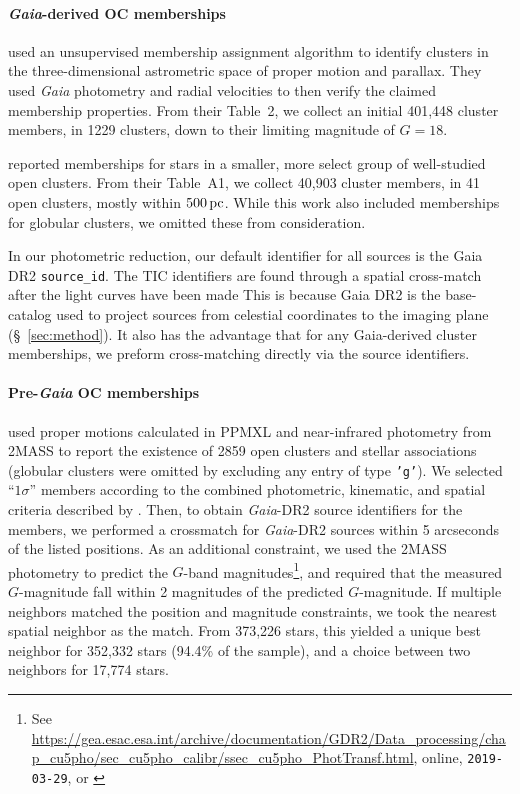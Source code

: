 \documentclass[12pt,twocolumn,tighten]{aastex62}
\begin{document}
\paragraph{{\it Gaia}-derived OC memberships}

\citet{cantat-gaudin_gaia_2018} used an unsupervised membership
assignment algorithm to identify clusters in the three-dimensional
astrometric space of proper motion and parallax. They used {\it Gaia}
photometry and radial velocities to then verify the claimed
membership properties.  From their Table~2, we collect an initial 401{,}448
cluster members, in 1229 clusters, down to their limiting magnitude of
$G=18$.

\citet{gaia_hr_2018} reported memberships for stars in a smaller, more
select group of well-studied open clusters. From their Table~A1, we
collect 40{,}903 cluster members, in 41 open clusters, mostly within
$500\,{\rm pc}$. While this work also included memberships for
globular clusters, we omitted these from consideration.

In our photometric reduction,  our default identifier for all sources
is the Gaia DR2 \texttt{source\_id}.
The TIC identifiers are found through a spatial cross-match after the light 
curves have been made
\citep{stassun_TIC_2018,stassun_TIC8_2019}
This is because Gaia DR2 is the base-catalog used to project
sources from celestial coordinates to the imaging plane (\S~\ref{sec:method}).
It also has the advantage that for any Gaia-derived cluster memberships, 
we preform cross-matching directly via the source identifiers.



\paragraph{Pre-{\it Gaia} OC memberships}
\citet{Kharchenko_et_al_2013} used proper motions calculated in PPMXL
\citep[][a combination of USNO-B1{.}0 and 2MASS
astrometry]{roeser_ppmxl_2010} and near-infrared photometry from 2MASS
\citep{skrutskie_tmass_2006} to report the existence of 2859 open
clusters and stellar associations (globular clusters were
omitted by excluding any entry of type \texttt{'g'}).
We selected ``$1\sigma$'' members according to the
combined photometric, kinematic, and spatial criteria described by
\citet{kharchenko_global_2012}.  Then, to obtain {\it Gaia}-DR2 source
identifiers for the members, we performed a crossmatch for {\it
Gaia}-DR2 sources within 5 arcseconds of the listed positions.  As an
additional constraint, we used the 2MASS photometry to predict the
$G$-band magnitudes\footnote{See
\url{https://gea.esac.esa.int/archive/documentation/GDR2/Data_processing/chap_cu5pho/sec_cu5pho_calibr/ssec_cu5pho_PhotTransf.html},
online, \texttt{2019-03-29}, or \citet{carrasco_gaia_2016}}, and
required that the measured $G$-magnitude fall within 2 magnitudes of
the predicted $G$-magnitude.  If multiple neighbors matched the
position and magnitude constraints, we took the nearest spatial
neighbor as the match.  From 373{,}226 stars, this yielded a unique
best neighbor for 352{,}332 stars (94.4\% of the sample), and a choice
between two neighbors for 17{,}774 stars. 
\end{document}
